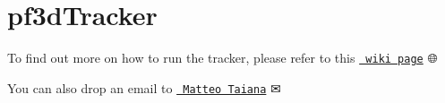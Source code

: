 \chapter{pf3d\+Tracker}
\label{md__2home_2runner_2work_2icub-basic-demos_2icub-basic-demos_2gh-pages_2pf3dTracker_2README}
\label{md__2home_2runner_2work_2icub-basic-demos_2icub-basic-demos_2gh-pages_2pf3dTracker_2README_autotoc_md1}%
%
 To find out more on how to run the tracker, please refer to this \href{http://mediawiki.isr.ist.utl.pt/wiki/3D_ball_tracker}{\texttt{ wiki page}} 🌐

You can also drop an email to \href{mailto:mtaiana@isr.ist.utl.pt}{\texttt{ Matteo Taiana}} ✉ 